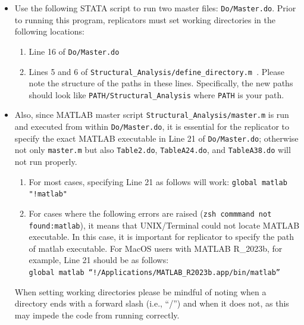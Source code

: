 \documentclass[12pt,notitlepage]{article}
\begin{document}
\begin{itemize}
\item Use the following STATA script to run two master files: \texttt{Do/Master.do}.  Prior to running this program, replicators must set working directories in the following locations: 
\begin{enumerate}
\item Line 16 of \texttt{Do/Master.do}
\item Lines 5 and 6 of \texttt{Structural\_Analysis/define\_directory.m }. Please note the structure of the paths in these lines. Specifically, the new paths should look like \texttt{PATH/Structural\_Analysis} where  \texttt{PATH} is your path. 
\end{enumerate}

\item Also, since MATLAB master script \texttt{Structural\_Analysis/master.m} is run and executed from within \texttt{Do/Master.do}, it is essential for the replicator to specify the exact MATLAB executable in Line 21 of \texttt{Do/Master.do}; otherwise not only \texttt{master.m} but also \texttt{Table2.do}, \texttt{TableA24.do}, and \texttt{TableA38.do} will not run properly. 
\begin{enumerate}
\item For most cases, specifying Line 21 as follows will work: \texttt{global matlab "!matlab"}
\item For cases where the following errors are raised (\texttt{zsh commmand not found:matlab}), it means that UNIX/Terminal could not locate MATLAB executable. In this case, it is important for replicator to specify the path of matlab executable. For MacOS users with MATLAB R\_2023b, for example, Line 21 should be as follows: \\ \texttt{global matlab ``!/Applications/MATLAB\_R2023b.app/bin/matlab''}
\end{enumerate}

When setting working directories please be mindful of noting when a directory ends with a forward slash (i.e., ``/'') and when it does not, as this may impede the code from running correctly. 




\end{itemize}
\end{document}
